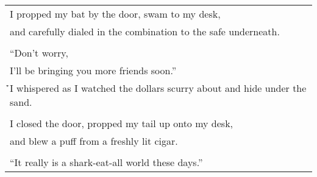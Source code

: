 \documentclass{article}
\begin{document}
\begin{center}
\begin{tabular}{l}
\end{tabular}\\
\begin{tabular}{l}
I propped my bat by the door, swam to my desk, \\
and carefully dialed in the combination to the safe underneath. \\
\\
``Don't worry, \\
I'll be bringing you more friends soon.'' \\
\h\h{}I whispered as I watched the dollars scurry about and hide under the sand. \\
\\
I closed the door, propped my tail up onto my desk, \\
and blew a puff from a freshly lit cigar. \\
\\
``It really is a shark-eat-all world these days.'' \\
\end{tabular}
\end{center}
\end{document}
